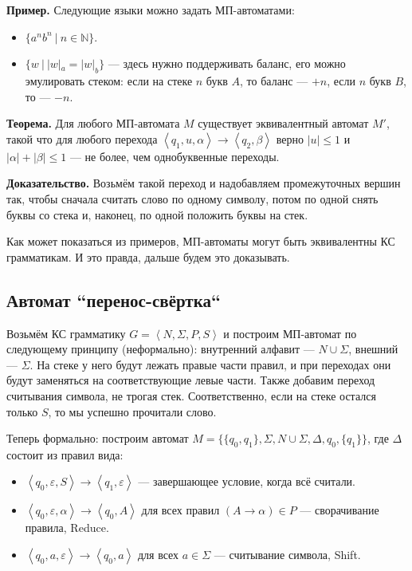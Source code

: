 \textbf{Пример.} Следующие языки можно задать МП-автоматами:
\begin{itemize}
    \item $\{a^n b^n~|~n \in \mathbb N\}$.
    \item $\{w~|~|w|_a = |w|_b\}$ --- здесь нужно поддерживать баланс, его можно эмулировать стеком: если на стеке $n$ букв $A$, то баланс --- $+n$, если $n$ букв $B$, то --- $-n$.
\end{itemize}

\textbf{Теорема.} Для любого МП-автомата $M$ существует эквивалентный автомат $M'$, такой что для любого перехода $\left<q_1, u, \alpha \right> \to \left< q_2, \beta \right>$ верно $|u| \le 1$ и $|\alpha| + |\beta| \le 1$ --- не более, чем однобуквенные переходы.

\textbf{Доказательство.} Возьмём такой переход и надобавляем промежуточных вершин так, чтобы сначала считать слово по одному символу, потом по одной снять буквы со стека и, наконец, по одной положить буквы на стек.

\QED

Как может показаться из примеров, МП-автоматы могут быть эквивалентны КС грамматикам. 
И это правда, дальше будем это доказывать.
\subsection{Автомат ``перенос-свёртка``}
Возьмём КС грамматику $G = \left<N, \Sigma, P, S\right>$ и построим МП-автомат по следующему принципу (неформально): внутренний алфавит --- $N \cup \Sigma$, внешний --- $\Sigma$.
На стеке у него будут лежать правые части правил, и при переходах они будут заменяться на соответствующие левые части.
Также добавим переход считывания символа, не трогая стек.
Соответственно, если на стеке остался только $S$, то мы успешно прочитали слово.

Теперь формально: построим автомат $M = \{\{q_0, q_1\}, \Sigma, N \cup \Sigma, \Delta, q_0, \{q_1\}\}$, где $\Delta$ состоит из правил вида:
\begin{itemize}
    \item $\left<q_0, \varepsilon, S \right> \to \left< q_1, \varepsilon \right>$ --- завершающее условие, когда всё считали.
    \item $\left<q_0, \varepsilon, \alpha \right> \to \left< q_0, A \right>$ для всех правил $(A \to \alpha) \in P$ --- сворачивание правила, Reduce.
    \item $\left<q_0, a, \varepsilon \right> \to \left<q_0, a \right>$ для всех $a \in \Sigma$ --- считывание символа, Shift.
\end{itemize}

